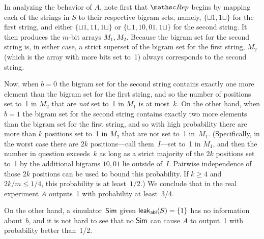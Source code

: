 In analyzing the behavior of $A$, note first that $\Rep$ begins by
mapping each of the strings in $S$ to their respective bigram sets,
namely, $\{\sqcup 1, 1\sqcup\}$ for the first string, and either
$\{\sqcup 1, 11, 1\sqcup\}$ or $\{\sqcup 1, 10, 01, 1\sqcup\}$ for
the second string. It then produces the $m$-bit arrays $M_1, M_2$.
Because the bigram set for the second string is, in either case, a
strict superset of the bigram set for the first string, $M_2$ (which
is the array with more bits set to~1) always corresponds to the
second string.

Now, when $b=0$ the bigram set for the second string contains
exactly one more element than the bigram set for the first string,
and so the number of positions set to~1 in $M_2$ that are \emph{not}
set to~1 in $M_1$ is at most~$k$. On the other hand, when $b=1$ the
bigram set for the second string contains exactly two more elements
than the bigram set for the first string, and so with high
probability there are more than $k$ positions set to~1 in $M_2$ that
are not set to~1 in~$M_1$. (Specifically, in the worst case there
are $2k$ positions---call them~$I$---set to~1 in $M_1$, and then the
number in question exceeds~$k$ as long as a strict majority of the
$2k$ positions set to~1 by the additional bigrams $10, 01$ lie
outside of~$I$. Pairwise independence of those $2k$ positions can be
used to bound this probability. If $k\geq 4$ and $2k/m \leq 1/4$,
this probability is at least~$1/2$.)  We conclude that in the real experiment $A$
outputs~1 with probability at least~3/4.

On the other hand, a simulator~${\sf Sim}$ given ${\sf
leak}_{\mathsf{abl}}(S) = \{1\}$ has no information about~$b$, and
it is not hard to see that no ${\sf Sim}$ can cause $A$ to output~1 with
probability better than~1/2.






